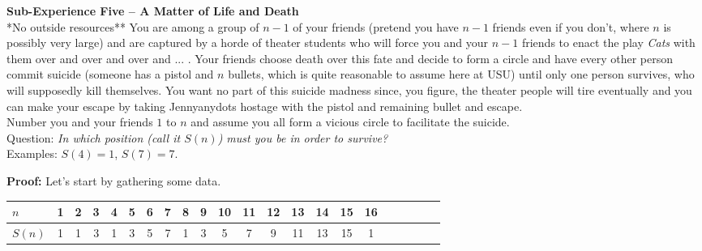\documentclass[10pt, AMS Euler]{article}
\begin{document}
	\vspace{2em}
	
	\noindent \maltese \hspace{1em} {\bf Sub-Experience Five -- A Matter of Life and Death}\\
	
	\noindent **No outside resources**  You are among a group of $n-1$  of your friends (pretend you have $n-1$ friends even if you don't, where $n$ is possibly very large)
	and are captured by a horde of theater students who will force you and your $n-1$ friends to
	enact the play \emph{Cats} with them over and over and over and ... .  
	Your friends choose death over this fate and decide to
	form a circle and have every other person commit suicide (someone has a pistol and $n$ bullets,
	which is quite reasonable to assume here at USU) until only one person survives, who will
	supposedly kill themselves.  
	You want no part of this suicide madness since, you figure, the theater people will tire eventually and
	you can make your escape by taking Jennyanydots hostage with the pistol and remaining bullet and escape.\\
	
	\noindent Number you and your friends $1$ to $n$ and assume you all form a vicious circle to facilitate the suicide.\\
	
	\noindent \textsf{Question:} \emph{In which position (call it $S(n)$) must you be in order to survive?}\\
	
	\noindent Examples: $S(4) =1$, $S(7) =7$.
	
	\vspace{1em}
	
	\noindent \underline{\hspace{5in}}

	\noindent \textbf{Proof:} Let's start  by gathering some data.\\

    \begin{center}
    \begin{tabular}{l|ccccccccccccccccccccc}\hline
    {\bf $n$ } & 1 & 2 & 3 & 4 & 5 & 6 & 7 & 8 & 9 & 10 & 11 & 12 & 13 & 14 & 15 & 16 \\
    \hline \hline
    {\bf $S(n)$} & 1 & 1 & 3 & 1 & 3 & 5 & 7 & 1 & 3 & 5 & 7 & 9 & 11 & 13 & 15 & 1 \\
    \end{tabular}
    \end{center}
\end{document}
